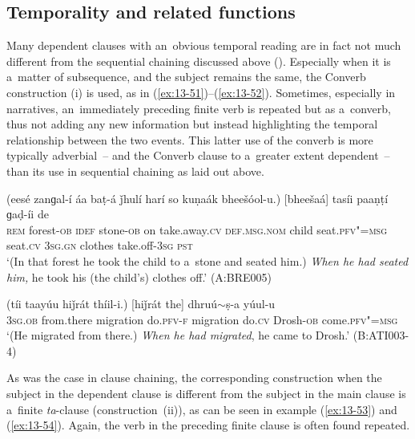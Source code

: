 \subsection{Temporality and related functions}
\label{subsec:13-4-1}

 Many dependent clauses with an~obvious temporal reading are in fact not much different from the sequential chaining discussed above (). Especially when it is a~matter of subsequence, and the subject remains the same, the Converb construction (i) is used, as in (\ref{ex:13-51})--(\ref{ex:13-52}). Sometimes, especially in narratives, an~immediately preceding finite verb is repeated but as a~converb, thus not adding any new information but instead highlighting the temporal relationship between the two events. This latter use of the converb is more typically adverbial~-- and the Converb clause to a~greater extent dependent~-- than its use in sequential chaining as laid out above.

\begin{exe}
\ex
\label{ex:13-51}
\gll (eesé zanɡal-í áa baṭ-á ǰhulí harí so kuṇaák bheešóol-u.) [bheešaá] tasíi paaṇṭí ɡaḍ-íi de \\
\textsc{rem} forest-\textsc{ob} \textsc{idef} stone-\textsc{ob} on take.away.\textsc{cv}   \textsc{def.msg.nom} child seat.\textsc{pfv"=msg} seat.\textsc{cv} \textsc{3sg.gn} clothes take.off-\textsc{3sg} \textsc{pst} \\
\glt `(In that forest he took the child to a~stone and seated him.) \textit{When he had seated him,} he took his (the child's) clothes off.' (A:BRE005)

\ex
\label{ex:13-52}
\gll (tíi taayúu hiǰrát thíil-i.) [hiǰrát the] dhruú$\sim$ṣ-a yúul-u \\
\textsc{3sg.ob} from.there migration do.\textsc{pfv-f}    migration do.\textsc{cv} Drosh-\textsc{ob} come.\textsc{pfv"=msg} \\
\glt `(He migrated from there.) \textit{When he had migrated}, he came to Drosh.' (B:ATI003-4) 
\end{exe}

As was the case in clause chaining, the corresponding construction when the subject in the dependent
clause is different from the subject in the main clause is a~finite \textit{ta}-clause
(construction~(ii)), as can be seen in example (\ref{ex:13-53}) and (\ref{ex:13-54}). Again, the verb in the preceding finite clause is often found repeated.

